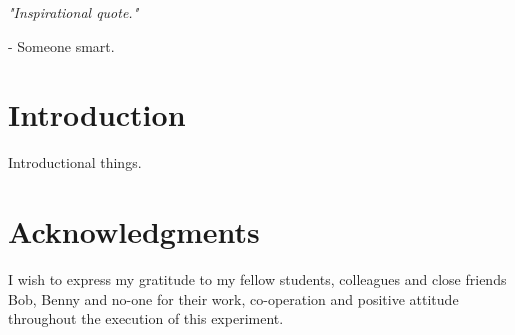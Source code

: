 \documentclass[fleqn,10pt]{SelfArx} %
\affiliation{EricNNilsson@gmail.com}
\newlength{\tocsep}
\begin{document}
\flushbottom %
\maketitle %

\noindent
\textit{"Inspirational quote."}
\begin{center}
- Someone smart.
\end{center}

\tableofcontents %
\thispagestyle{empty} %

\section*{Introduction} %
Introductional things.

\section*{Acknowledgments} %
I wish to express my gratitude to my fellow students, colleagues and close friends Bob, Benny and no-one for their work, co-operation and positive attitude throughout the execution of this experiment.



\end{document}
